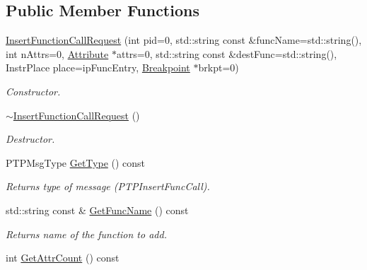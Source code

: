 \subsection*{Public Member Functions}
\begin{DoxyCompactItemize}
\item 
\hyperlink{class_common_1_1_insert_function_call_request_afa5cae0e9adb14835c8afcca958454aa}{Insert\-Function\-Call\-Request} (int pid=0, std\-::string const \&func\-Name=std\-::string(), int n\-Attrs=0, \hyperlink{class_common_1_1_attribute}{Attribute} $\ast$attrs=0, std\-::string const \&dest\-Func=std\-::string(), Instr\-Place place=ip\-Func\-Entry, \hyperlink{class_common_1_1_breakpoint}{Breakpoint} $\ast$brkpt=0)
\begin{DoxyCompactList}\small\item\em Constructor. \end{DoxyCompactList}\item 
\hypertarget{class_common_1_1_insert_function_call_request_a0218e230b6e09b5cd8cba72940d716a7}{\hyperlink{class_common_1_1_insert_function_call_request_a0218e230b6e09b5cd8cba72940d716a7}{$\sim$\-Insert\-Function\-Call\-Request} ()}\label{class_common_1_1_insert_function_call_request_a0218e230b6e09b5cd8cba72940d716a7}

\begin{DoxyCompactList}\small\item\em Destructor. \end{DoxyCompactList}\item 
\hypertarget{class_common_1_1_insert_function_call_request_ab421754e776375ae71ffebec5489999d}{P\-T\-P\-Msg\-Type \hyperlink{class_common_1_1_insert_function_call_request_ab421754e776375ae71ffebec5489999d}{Get\-Type} () const }\label{class_common_1_1_insert_function_call_request_ab421754e776375ae71ffebec5489999d}

\begin{DoxyCompactList}\small\item\em Returns type of message (P\-T\-P\-Insert\-Func\-Call). \end{DoxyCompactList}\item 
\hypertarget{class_common_1_1_insert_function_call_request_a019fbc8dad4649cd2ead98062b7abd69}{std\-::string const \& \hyperlink{class_common_1_1_insert_function_call_request_a019fbc8dad4649cd2ead98062b7abd69}{Get\-Func\-Name} () const }\label{class_common_1_1_insert_function_call_request_a019fbc8dad4649cd2ead98062b7abd69}

\begin{DoxyCompactList}\small\item\em Returns name of the function to add. \end{DoxyCompactList}\item 
\hypertarget{class_common_1_1_insert_function_call_request_a1a23474cd80797817bb90e422f1b083f}{int \hyperlink{class_common_1_1_insert_function_call_request_a1a23474cd80797817bb90e422f1b083f}{Get\-Attr\-Count} () const }\label{class_common_1_1_insert_function_call_request_a1a23474cd80797817bb90e422f1b083f}


\end{DoxyCompactItemize}

